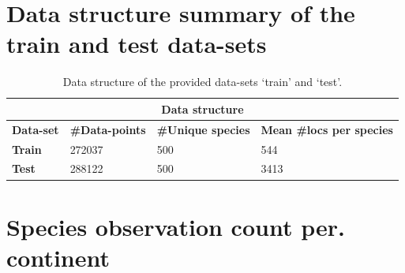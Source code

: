 \section{Data structure summary of the train and test data-sets}\label{appendix:datastruct}

\begin{table}[H]
\begin{tabular}{ |p{3cm}||p{3cm}|p{3cm}|p{3cm}|  }
 \hline
 \multicolumn{4}{|c|}{\textbf{Data structure}} \\
 \hline
 \rowcolor{lightgray} \footnotesize{\textbf{Data-set}}& \footnotesize{\textbf{\#Data-points}} & \footnotesize{\textbf{\#Unique species}} & \footnotesize{\textbf{Mean \#locs per species}}\\
 \hline
 \footnotesize{\textbf{Train}}   & \footnotesize{272037}    & \footnotesize{500} &   \footnotesize{544}\\
 \footnotesize{\textbf{Test}} &   \footnotesize{288122}  & \footnotesize{500}   &\footnotesize{3413}\\

 \hline
\end{tabular}
\caption{Data structure of the provided data-sets `train' and `test'.}
\label{tab:my_label}
\end{table}



\section{Species observation count per. continent}\label{appendix:table1}

